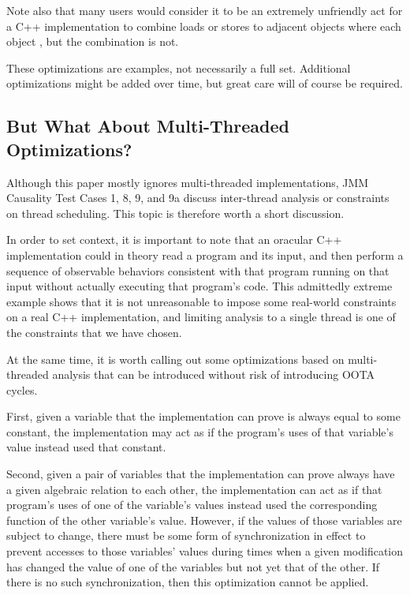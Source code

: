 \documentclass[10]{article}
\begin{document}
Note also that many users would consider it to be an extremely unfriendly
act for a C++ implementation to combine loads or stores to adjacent
objects where each object , but the combination is not.

These optimizations are examples, not necessarily a full set.
Additional optimizations might be added over time, but great care will
of course be required.

\subsection{But What About Multi-Threaded Optimizations?}
\label{sec:But What About Multi-Threaded Optimizations?}

Although this paper mostly ignores multi-threaded implementations,
JMM Causality Test Cases 1, 8, 9, and 9a discuss inter-thread
analysis or constraints on thread scheduling.
This topic is therefore worth a short discussion.

In order to set context, it is important to note that an oracular C++
implementation could in theory read a program and its input, and then
perform a sequence of observable behaviors consistent with that program
running on that input without actually executing that program's code.
This admittedly extreme example shows that it is not unreasonable to
impose some real-world constraints on a real C++ implementation, and
limiting analysis to a single thread is one of the constraints that we
have chosen.

At the same time, it is worth calling out some optimizations based on
multi-threaded analysis that can be introduced without risk of
introducing OOTA cycles.

First, given a variable that the implementation can prove is always equal
to some constant, the implementation may act as if the program's uses of
that variable's value instead used that constant.

Second, given a pair of variables that the implementation can prove always
have a given algebraic relation to each other, the implementation can
act as if that program's uses of one of the variable's values instead
used the corresponding function of the other variable's value.
However, if the values of those variables are subject to change, there
must be some form of synchronization in effect to prevent accesses
to those variables' values during times when a given modification has
changed the value of one of the variables but not yet that of the other.
If there is no such synchronization, then this optimization cannot
be applied.
\end{document}
